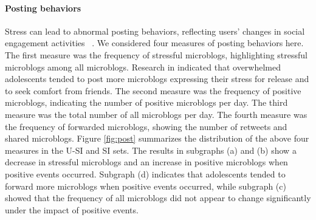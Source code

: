 \documentclass[5p,times,numbers,authoryear]{elsarticle}
\begin{document}
\paragraph{\textbf{Posting behaviors}}
Stress can lead to abnormal posting behaviors,
reflecting users' changes in social engagement activities ~\citep{Liang2015Teenagers}.
We considered four measures of posting behaviors here.
The first measure was the frequency of stressful microblogs,
highlighting stressful microblogs among all microblogs.
Research in \cite{Li2017Analyzing} indicated that overwhelmed adolescents
tended to post more microblogs expressing their stress for release and to seek comfort from friends.
The second measure was the frequency of positive microblogs,
indicating the number of positive microblogs per day.
The third measure was the total number of all microblogs per day.
The fourth measure was the frequency of forwarded microblogs,
showing the number of retweets and shared microblogs.
Figure \ref{fig:post} summarizes the distribution of the above four measures in the U-SI and SI sets.
The results in subgraphs (a) and (b) show a decrease in stressful microblogs and an
increase in positive microblogs when positive events occurred.
Subgraph (d) indicates that adolescents tended to forward more microblogs when positive events occurred, 
while subgraph (c) showed that the frequency of all microblogs did not appear to change significantly under the impact of positive events.
\end{document}
